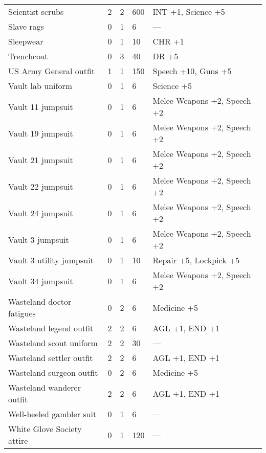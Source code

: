 \begin{longtable}{|p{4cm}|p{1.2cm}|p{1.2cm}|p{1.2cm}|p{4cm}|}
Scientist scrubs  & 2 & 2 & 600 & INT +1, Science +5  \\
Slave rags  & 0 & 1 & 6 & —  \\
Sleepwear  & 0 & 1 & 10 & CHR +1  \\
Trenchcoat  & 0 & 3 & 40 & DR +5  \\
US Army General outfit  & 1 & 1 & 150 & Speech +10, Guns +5  \\
Vault lab uniform  & 0 & 1 & 6 & Science +5  \\
Vault 11 jumpsuit  & 0 & 1 & 6 & Melee Weapons +2, Speech +2  \\
Vault 19 jumpsuit  & 0 & 1 & 6 & Melee Weapons +2, Speech +2  \\
Vault 21 jumpsuit  & 0 & 1 & 6 & Melee Weapons +2, Speech +2  \\
Vault 22 jumpsuit  & 0 & 1 & 6 & Melee Weapons +2, Speech +2  \\
Vault 24 jumpsuit  & 0 & 1 & 6 & Melee Weapons +2, Speech +2  \\
Vault 3 jumpsuit  & 0 & 1 & 6 & Melee Weapons +2, Speech +2  \\
Vault 3 utility jumpsuit  & 0 & 1 & 10 & Repair +5, Lockpick +5  \\
Vault 34 jumpsuit  & 0 & 1 & 6 & Melee Weapons +2, Speech +2  \\
Wasteland doctor fatigues  & 0 & 2 & 6 & Medicine +5  \\
Wasteland legend outfit  & 2 & 2 & 6 & AGL +1, END +1  \\
Wasteland scout uniform  & 2 & 2 & 30 & —  \\
Wasteland settler outfit  & 2 & 2 & 6 & AGL +1, END +1  \\
Wasteland surgeon outfit  & 0 & 2 & 6 & Medicine +5  \\
Wasteland wanderer outfit  & 2 & 2 & 6 & AGL +1, END +1  \\
Well-heeled gambler suit  & 0 & 1 & 6 & —  \\
White Glove Society attire  & 0 & 1 & 120 & —  \\
\hline
\end{longtable}
